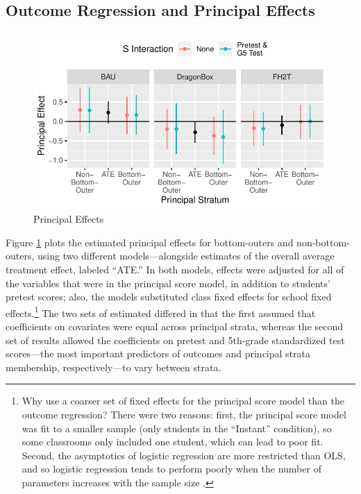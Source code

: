 \documentclass[11pt]{article} %
\begin{document}
\subsection{Outcome Regression and Principal Effects}\label{sec:outMod}
\begin{figure}
  \centering
  \includegraphics{../figure/prinEffs.pdf}
  \caption{Principal Effects}
  \label{fig:effects}
\end{figure}

Figure \ref{fig:effects} plots the estimated principal effects for bottom-outers and non-bottom-outers, using two different models---alongside estimates of the overall average treatment effect, labeled ``ATE.'' In both models, effects were adjusted for all of the variables that were in the principal score model, in addition to students' pretest scores; also, the models substituted class fixed effects for school fixed effects.\footnote{Why use a coarser set of fixed effects for the principal score model than the outcome regression? There were two reasons: first, the principal score model was fit to a smaller sample (only students in the ``Instant'' condition), so some classrooms only included one student, which can lead to poor fit. Second, the asymptotics of logistic regression are more restricted than OLS, and so logistic regression tends to perform poorly when the number of parameters increases with the sample size \citep{agresti}.}
The two sets of estimated differed in that the first assumed that coefficients on covariates were equal across principal strata, whereas the second set of results allowed the coefficients on pretest and 5th-grade standardized test scores---the most important predictors of outcomes and principal strata membership, respectively---to vary between strata.
\end{document}
